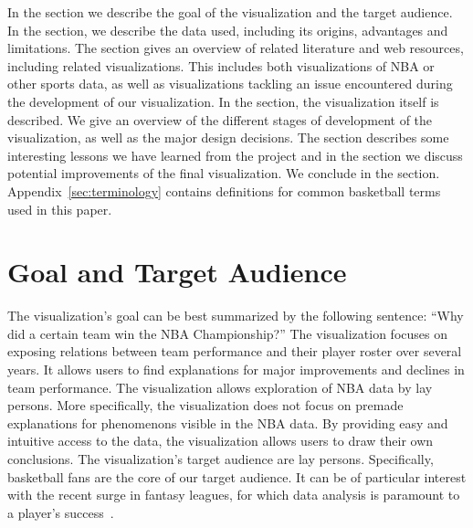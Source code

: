 \documentclass[chi_draft]{sigchi}
\begin{document}
In the  section we describe the goal of the visualization and the
target audience. In the  section, we describe the data used, including its origins, advantages and limitations. The  section gives an overview of related literature and web resources, including related
visualizations. This includes both visualizations of NBA or other sports data,
as well as visualizations tackling an issue encountered during the development of
our visualization. In the  section, the visualization itself is described. We give an overview of the different stages of development
of the visualization, as well as the major design decisions.
The  section describes some interesting lessons we have learned from the project and in the  section we discuss potential  improvements of the final visualization. We conclude in the  
 section. Appendix~\ref{sec:terminology} contains definitions 
for common basketball terms used in this paper.

\section{Goal and Target Audience}\label{sec:goal} 
The visualization's goal can be best summarized by the following sentence:
``Why did a certain team win the NBA Championship?'' The visualization focuses
on exposing relations between team performance and their player roster over
several years. It allows users to find explanations for major improvements and
declines in team performance.  The visualization allows exploration of NBA data
by lay persons.  More specifically, the visualization does not focus on premade
explanations for phenomenons visible in the NBA data. By providing easy and
intuitive access to the data, the visualization allows users to draw their own
conclusions. The visualization's target audience are lay persons. Specifically,
basketball fans are the core of our target audience. It can be of particular
interest with the recent surge in fantasy leagues, for which data analysis is
paramount to a player's success~\cite{fantasy,fantasyskill}.
\end{document}
